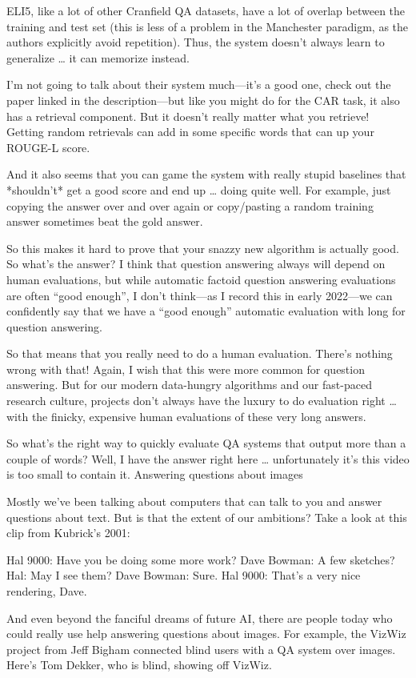 ELI5, like a lot of other Cranfield QA datasets, have a lot of overlap between the training and test set (this is less of a problem in the Manchester paradigm, as the authors explicitly avoid repetition).  Thus, the system doesn’t always learn to generalize … it can memorize instead.

I’m not going to talk about their system much—it’s a good one, check out the paper linked in the description—but like you might do for the CAR task, it also has a retrieval component.  But it doesn’t really matter what you retrieve!  Getting random retrievals can add in some specific words that can up your ROUGE-L score.

And it also seems that you can game the system with really stupid baselines that *shouldn’t* get a good score and end up … doing quite well.  For example, just copying the answer over and over again or copy/pasting a random training answer sometimes beat the gold answer.

So this makes it hard to prove that your snazzy new algorithm is actually good.  So what’s the answer?  I think that question answering always will depend on human evaluations, but while automatic factoid question answering evaluations are often “good enough”, I don’t think—as I record this in early 2022—we can confidently say that we have a “good enough” automatic evaluation with long for question answering.

So that means that you really need to do a human evaluation.  There’s nothing wrong with that!  Again, I wish that this were more common for question answering.  But for our modern data-hungry algorithms and our fast-paced research culture, projects don’t always have the luxury to do evaluation right … with the finicky, expensive human evaluations of these very long answers.

So what’s the right way to quickly evaluate QA systems that output more than a couple of words?  Well, I have the answer right here … unfortunately it’s this video is too small to contain it.
Answering questions about images


Mostly we’ve been talking about computers that can talk to you and answer questions about text.  But is that the extent of our ambitions?  Take a look at this clip from Kubrick’s 2001:

Hal 9000: Have you be doing some more work?
Dave Bowman: A few sketches?
Hal: May I see them?
Dave Bowman: Sure.
Hal 9000: That’s a very nice rendering, Dave.

And even beyond the fanciful dreams of future AI, there are people today who could really use help answering questions about images.  For example, the VizWiz project from Jeff Bigham connected blind users with a QA system over images.  Here’s Tom Dekker, who is blind, showing off VizWiz.

